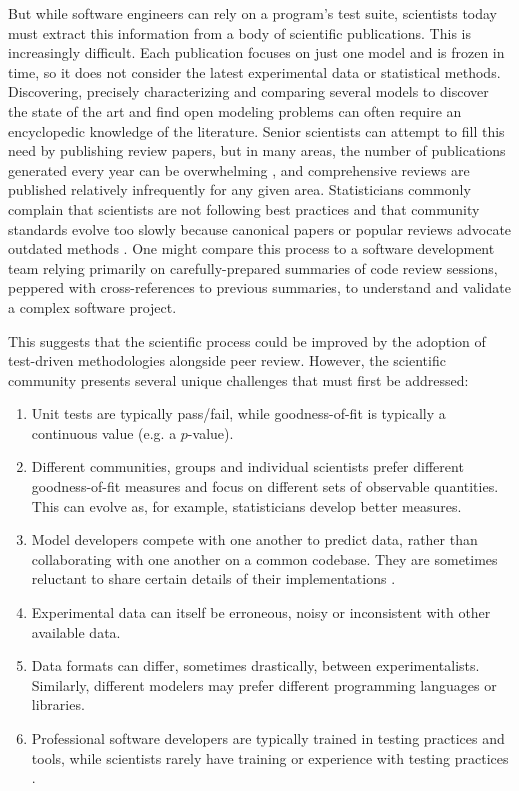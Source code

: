 \documentclass[9pt]{sig-alternate}
\begin{document}
But while software engineers can rely on a program's test suite, scientists today must extract this information from a body of scientific publications. This is increasingly difficult. Each publication focuses on just one model and is frozen in time, so it does not consider the latest experimental data or statistical methods. Discovering, precisely characterizing and comparing several models to discover the state of the art and find open modeling problems can often require an encyclopedic knowledge of the literature. Senior scientists can attempt to fill this need by publishing review papers, but in many areas, the number of publications generated every year can be overwhelming \cite{jinha_article_2010}, and comprehensive reviews are published relatively infrequently for any given area. Statisticians commonly complain that scientists are not following best practices and that community standards evolve too slowly because canonical papers or popular reviews advocate outdated methods \cite{grumpystatisticians}. One might compare this process to a software development team relying primarily on carefully-prepared summaries of code review sessions, peppered with cross-references to previous summaries, to understand and validate a complex software project.

This suggests that the scientific process could be improved by the adoption of test-driven methodologies alongside peer review. However, the scientific community presents several unique challenges that must first be addressed:
\begin{enumerate}
\item Unit tests are typically pass/fail, while goodness-of-fit is typically a continuous value (e.g. a $p$-value). 
\item Different communities, groups and individual scientists prefer different goodness-of-fit measures and focus on different sets of observable quantities. This can evolve as, for example, statisticians develop better measures.
\item Model developers compete with one another to predict data, rather than collaborating with one another on a common codebase. They are sometimes reluctant to share certain details of their implementations \cite{badscientists}.
\item Experimental data can itself be erroneous, noisy or inconsistent with other available data.
\item Data formats can differ, sometimes drastically, between experimentalists. Similarly, different modelers may prefer different programming languages or libraries.
\item Professional software developers are typically trained in testing practices and tools, while scientists  rarely have training or experience with testing practices \cite{badscientists2}.
\end{enumerate}
\end{document}
